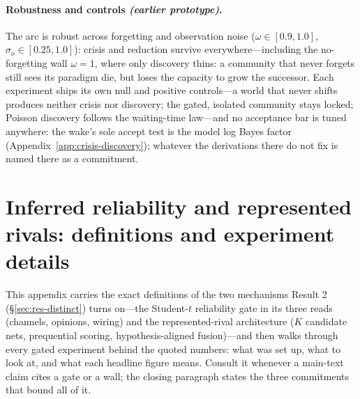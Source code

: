 \documentclass[runningheads]{llncs}
\begin{document}
\paragraph{Robustness and controls \emph{(earlier prototype)}.}
The arc is robust across forgetting and observation noise ($\omega\in[0.9,1.0]$,
$\sigma_o\in[0.25,1.0]$): crisis and reduction survive everywhere---including the
no-forgetting wall $\omega=1$, where only discovery thins: a community that never forgets
still sees its paradigm die, but loses the capacity to grow the successor. Each experiment
ships its own null and positive controls---a world that never shifts produces neither crisis
nor discovery; the gated, isolated community stays locked; Poisson discovery follows the
waiting-time law---and no acceptance bar is tuned anywhere: the wake's sole accept test is
the model log Bayes factor (Appendix~\ref{app:crisis-discovery}); whatever the derivations
there do not fix is named there as a commitment.

\section{Inferred reliability and represented rivals: definitions and experiment details}
\label{app:reliability}

This appendix carries the exact definitions of the two mechanisms Result 2
(\S\ref{sec:res-distinct}) turns on---the Student-$t$ reliability gate in its three reads
(channels, opinions, wiring) and the represented-rival architecture ($K$ candidate nets,
prequential scoring, hypothesis-aligned fusion)---and then walks through every gated
experiment behind the quoted numbers: what was set up, what to look at, and what each
headline figure means. Consult it whenever a main-text claim cites a gate or a wall; the
closing paragraph states the three commitments that bound all of it.
\end{document}
